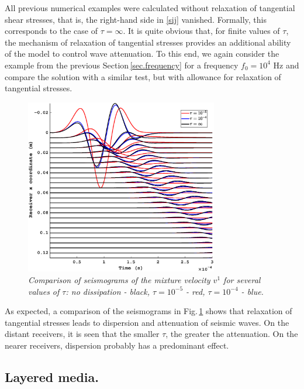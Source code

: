 \documentclass[3p,times,table]{article}
\begin{document}
All previous numerical examples were calculated without relaxation of tangential 
shear stresses, that is, the right-hand side in \eqref{sij} vanished. Formally, 
this corresponds to the case of $\tau=\infty$. It is quite obvious that, for 
finite values of
$ \tau $, the mechanism of relaxation of tangential stresses  provides 
an additional ability of the model to 
control wave attenuation. To this end, we again 
consider the
example from the previous Section\,\ref{sec.frequency} for a frequency 
$f_0=10^{4}$ Hz and compare 
the solution with a similar test, but with allowance for  relaxation of 
tangential stresses.
\begin{figure}[!htbp]
	\begin{center}
\includegraphics[draft=false,width=0.75\textwidth]{Figures/Compare_dissip_10_4}
	\end{center}
	\caption{{\footnotesize \it  
	Comparison of seismograms of the mixture velocity $v^1$  for several 
	values of $\tau$:
	no dissipation - black, $\tau=10^{-5}$ - red, $\tau=10^{-4}$ - blue.}}
	\label{fig: Compare_dissip}
\end{figure}
As expected, a comparison of the seismograms in Fig.\,\ref{fig: Compare_dissip} shows that relaxation of tangential stresses leads to dispersion and attenuation of seismic waves. On the distant receivers, it is seen that the smaller $\tau$, the greater the attenuation. On the nearer receivers, dispersion probably has a predominant effect.


\subsection{Layered media.}
\end{document}
